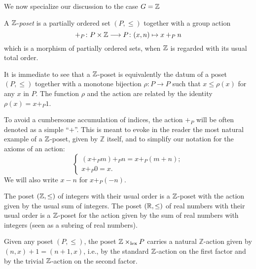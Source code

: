 We now specialize our discussion to the case $G=\mathbb{Z}$
\begin{definition}\label{zposet}
A $\mathbb{Z}$-\emph{poset} is a partially ordered set $(P,\leq)$ together with a group action 
\[
+_P\colon P\times \mathbb{Z} \longrightarrow P \colon (x,n) \mapsto x+_Pn 
\]
 which is a morphism of partially ordered sets, when $\mathbb{Z}$ is regarded with its usual total order.
\end{definition}
\begin{remark}\label{trivial.but.useful}
It is immediate to see that a $\mathbb{Z}$-poset is equivalently the datum of a poset $(P,\leq)$ together with a monotone bijection $\rho\colon P\to P$ such that $x\leq \rho(x)$ for any $x$ in $P$. The function $\rho$ and the action are related by the identity $\rho(x)=x+_P1$.
\end{remark}
\begin{notat}
To avoid a cumbersome accumulation of indices, the action $+_P$ will be often denoted as a simple ``$+$''. This is meant to evoke in the reader the most natural example of a $\mathbb{Z}$-poset, given by $\mathbb{Z}$ itself, and to simplify our notation for the axioms of an action:
\[
\begin{cases}
(x +_P m) +_P n = x +_P (m+n);\\
x +_P 0 = x.
\end{cases}
\]
We will also write $x-n$ for $x+_P(-n)$.
\end{notat}
\begin{example}The poset $(\mathbb{Z} ,\leq)$ of integers with their usual order is a $\mathbb{Z}$-poset with the action given by the usual sum of integers. The poset $(\mathbb{R},\leq)$ of real numbers with their usual order is a $\mathbb{Z}$-poset for the action given by the sum of real numbers with integers (seen as a subring of real numbers).
\end{example}
\begin{example}
Given any poset $(P,\leq)$, the poset $\mathbb{Z}\times_{\mathrm{lex}}P$ carries a natural $\mathbb{Z}$-action given by $(n,x)+1=(n+1,x)$, i.e., by the standard $\mathbb{Z}$-action on the first factor and by the trivial $\mathbb{Z}$-action on the second factor. 
\end{example}


